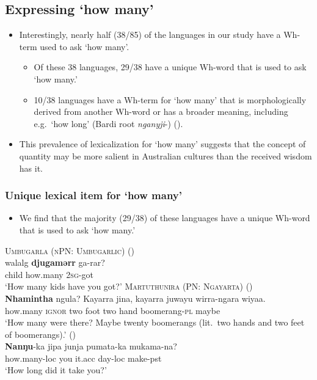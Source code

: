 \documentclass{article}
\makeatletter
\newcommand{\ofy}{/85} %
\makeatother
\begin{document}
\subsection{Expressing `how many'}
\begin{itemize}
\item Interestingly, nearly half (38\ofy{}) of the  languages in our study have a Wh-term used to ask `how many'. 
\begin{itemize}
    \item Of these 38 languages, 29/38 have a unique Wh-word that is used to ask `how many.'
  \item 10/38 languages have a Wh-term for `how many' that is morphologically derived from another Wh-word or has a broader meaning, including e.g.\ `how long' (Bardi root \textit{nganyji}-) (\citealt{bowern12}).
\end{itemize}

\item This prevalence of lexicalization for `how many' suggests that the concept of quantity may be more salient in Australian cultures than the received wisdom has it.
\end{itemize}

\subsubsection{Unique lexical item for `how many'}

\begin{itemize}
    \item We find that the majority (29/38) of these languages have a unique Wh-word that is used to ask `how many.'
\end{itemize}

\begin{exe}
  \ex \textsc{Umbugarla (nPN: Umbugarlic)} (\citealt[57]{davies89}) \\
  \gll walalg    \textbf{djugamərr}    ga-rar?\\
  child        how.many    2\textsc{sg}-got \\
  \glt `How many kids have you got?'
  \ex \textsc{Martuthunira (PN: Ngayarta)} (\citealt[190]{dench95})\\
  \gll \textbf{Nhamintha} ngula? Kayarra jina, kayarra juwayu wirra-ngara wiyaa.\\
  how.many \textsc{ignor} two foot two hand boomerang-\textsc{pl} maybe\\
  \glt `How many were there? Maybe twenty boomerangs (lit.\ two hands and two feet of boomerangs).'
  (\citealt[260]{breen71})\\
 \gll \textbf{Nanŋu}-ka       jipa  junja    pumata-ka mukama-na?\\
    how.many-{\sc loc} you it.{\sc acc} day{\sc -loc}      make-{\sc pst}\\
    \glt `How long did it take you?' 
\end{exe}
\end{document}

